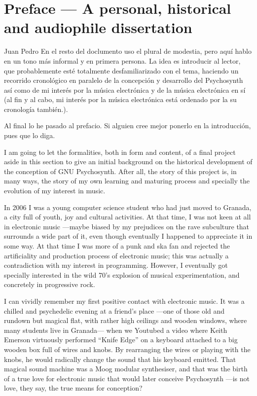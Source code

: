 
\chapter*{Preface --- A personal, historical and audiophile
  dissertation}

\begin{todo}{Juan Pedro}
  En el resto del doclumento uso el plural de modestia, pero aquí
  hablo en un tono más informal y en primera persona. La idea es
  introducir al lector, que probablemente esté totalmente
  desfamiliarizado con el tema, haciendo un recorrido cronológico en
  paralelo de la concepción y desarrollo del Psychosynth así como de
  mi interés por la música electrónica y de la música electrónica en
  sí (al fin y al cabo, mi interés por la música electrónica está
  ordenado por la su cronología también.). 

  Al final lo he pasado al prefacio. Si alguien cree mejor ponerlo en
  la introducción, pues que lo diga.
\end{todo}

I am going to let the formalities, both in form and content, of a
final project aside in this section to give an initial background on
the historical development of the conception of GNU Psychosynth. After
all, the story of this project is, in many ways, the story of my own
learning and maturing process and specially the evolution of my
interest in music.

In 2006 I was a young computer science student who had just moved to
Granada, a city full of youth, joy and cultural activities. At that
time, I was not keen at all in electronic music ---maybe biased by my
prejudices on the rave subculture that surrounds a wide part of it,
even though eventually I happened to appreciate it in some way. At
that time I was more of a punk and ska fan and rejected the
artificiality and production process of electronic music; this was
actually a contradiction with my interest in programming. However, I
eventually got specially interested in the wild 70's explosion of
musical experimentation, and concretely in progressive rock.

I can vividly remember my first positive contact with electronic
music. It was a chilled and psychedelic evening at a friend's place
---one of those old and rundown but magical flat, with rather high
ceilings and wooden windows, where many students live in Granada---
when we Youtubed a video where Keith Emerson virtuously performed
``Knife Edge'' on a keyboard attached to a big wooden box full of
wires and knobs. By rearranging the wires or playing with the knobs,
he would radically change the sound that his keyboard
emitted. That magical sound machine was a Moog modular synthesiser,
and that was the birth of a true love for electronic music that would
later conceive Psychosynth ---is not love, they say, the true means
for conception?

